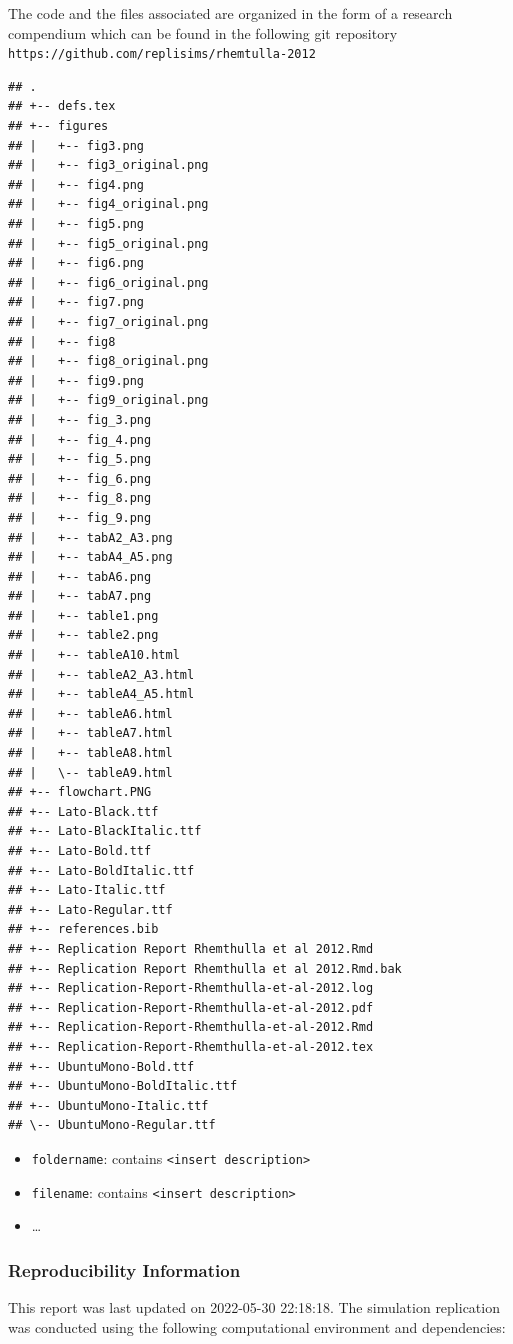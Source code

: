 \documentclass[10,a4paperpaper,]{article}
\begin{document}
The code and the files associated are organized in the form of a
research compendium which can be found in the following git repository
\texttt{https://github.com/replisims/rhemtulla-2012}

\begin{verbatim}
## .
## +-- defs.tex
## +-- figures
## |   +-- fig3.png
## |   +-- fig3_original.png
## |   +-- fig4.png
## |   +-- fig4_original.png
## |   +-- fig5.png
## |   +-- fig5_original.png
## |   +-- fig6.png
## |   +-- fig6_original.png
## |   +-- fig7.png
## |   +-- fig7_original.png
## |   +-- fig8
## |   +-- fig8_original.png
## |   +-- fig9.png
## |   +-- fig9_original.png
## |   +-- fig_3.png
## |   +-- fig_4.png
## |   +-- fig_5.png
## |   +-- fig_6.png
## |   +-- fig_8.png
## |   +-- fig_9.png
## |   +-- tabA2_A3.png
## |   +-- tabA4_A5.png
## |   +-- tabA6.png
## |   +-- tabA7.png
## |   +-- table1.png
## |   +-- table2.png
## |   +-- tableA10.html
## |   +-- tableA2_A3.html
## |   +-- tableA4_A5.html
## |   +-- tableA6.html
## |   +-- tableA7.html
## |   +-- tableA8.html
## |   \-- tableA9.html
## +-- flowchart.PNG
## +-- Lato-Black.ttf
## +-- Lato-BlackItalic.ttf
## +-- Lato-Bold.ttf
## +-- Lato-BoldItalic.ttf
## +-- Lato-Italic.ttf
## +-- Lato-Regular.ttf
## +-- references.bib
## +-- Replication Report Rhemthulla et al 2012.Rmd
## +-- Replication Report Rhemthulla et al 2012.Rmd.bak
## +-- Replication-Report-Rhemthulla-et-al-2012.log
## +-- Replication-Report-Rhemthulla-et-al-2012.pdf
## +-- Replication-Report-Rhemthulla-et-al-2012.Rmd
## +-- Replication-Report-Rhemthulla-et-al-2012.tex
## +-- UbuntuMono-Bold.ttf
## +-- UbuntuMono-BoldItalic.ttf
## +-- UbuntuMono-Italic.ttf
## \-- UbuntuMono-Regular.ttf
\end{verbatim}

\begin{itemize}
\tightlist
\item
  \texttt{foldername}: contains
  \texttt{\textless{}insert\ description\textgreater{}}
\item
  \texttt{filename}: contains
  \texttt{\textless{}insert\ description\textgreater{}}
\item
  \ldots{}
\end{itemize}

\subsubsection*{Reproducibility Information}

This report was last updated on 2022-05-30 22:18:18. The simulation
replication was conducted using the following computational environment
and dependencies:
\end{document}
